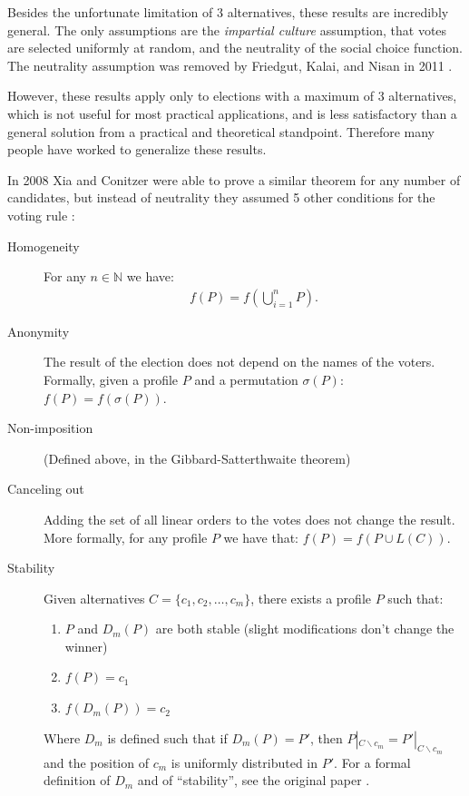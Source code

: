 	Besides the unfortunate limitation of 3 alternatives, these results are incredibly general. The only assumptions are the \emph{impartial culture} assumption, that votes are selected uniformly at random, and the neutrality of the social choice function. The neutrality assumption was removed by Friedgut, Kalai, and Nisan in 2011 \cite{friedgut2011quantitative}.

	However, these results apply only to elections with a maximum of 3 alternatives, which is not useful for most practical applications, and is less satisfactory than a general solution from a practical and theoretical standpoint. Therefore many people have worked to generalize these results.

	In 2008 Xia and Conitzer were able to prove a similar theorem for any number of candidates, but instead of neutrality they assumed 5 other conditions for the voting rule \cite{xia2008sufficient}:

	\begin{description}
		\item[Homogeneity] For any $n \in \mathbb{N}$ we have:
			\begin{align*}
				f(P) = f\left(\bigcup_{i=1}^n P\right).
			\end{align*}
		\item[Anonymity] The result of the election does not depend on the names of the voters. Formally, given a profile $P$ and a permutation $\sigma(P)$: $f(P) = f(\sigma(P))$.
		\item[Non-imposition] (Defined above, in the Gibbard-Satterthwaite theorem)
		\item[Canceling out] Adding the set of all linear orders to the votes does not change the result. More formally, for any profile $P$ we have that: $f(P) = f(P \cup L(C))$.
		\item[Stability] Given alternatives $C = \{c_1, c_2, \ldots, c_m\}$, there exists a profile $P$ such that:
			\begin{enumerate}
				\item $P$ and $D_{m}(P)$ are both stable (slight modifications don't change the winner)
				\item $f(P) = c_1$
				\item $f(D_{m}(P)) = c_2$
			\end{enumerate}
			Where $D_m$ is defined such that if $D_m(P) = P'$, then $P|_{C \backslash c_m} = P'|_{C \backslash c_m}$ and the position of $c_m$ is uniformly distributed in $P'$. For a formal definition of $D_m$ and of ``stability'', see the original paper \cite{xia2008sufficient}.
	\end{description}

